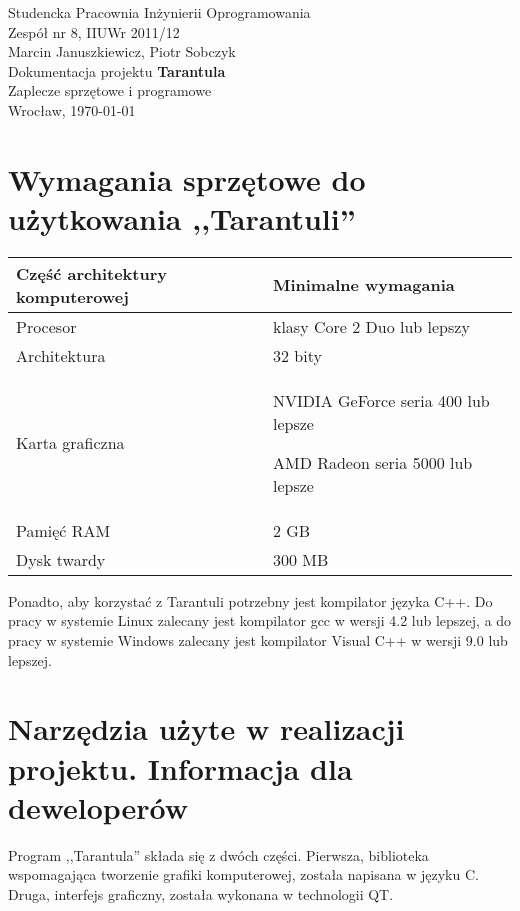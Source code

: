 \documentclass[11pt,leqno]{article}
\begin{document}

\begin{center}
\thispagestyle{empty}
{\Large Studencka Pracownia Inżynierii Oprogramowania}\\[0.5cm]
{\Large Zespół nr 8, IIUWr 2011/12}\\[2.5cm]

{Marcin Januszkiewicz, Piotr Sobczyk}\\[0.5cm]
{\huge Dokumentacja projektu \textbf{Tarantula}}\\[0.25cm]
{\Large Zaplecze sprzętowe i programowe}\\[0.5cm]
\vfill
{\large Wrocław, \today}
\end{center}

\newpage
\tableofcontents
\newpage


\section{Wymagania sprzętowe do użytkowania ,,Tarantuli''}

\begin{center}
 \begin{tabular}{|p{6cm}|p{7cm}|}
  \hline
 Część architektury komputerowej & Minimalne wymagania \\ \hline
  Procesor & klasy Core 2 Duo lub lepszy  \\ \hline
Architektura & 32 bity \\ \hline
 Karta graficzna & NVIDIA GeForce seria 400 lub lepsze


 AMD Radeon seria 5000 lub lepsze
  \\ \hline
Pamięć RAM & 2 GB \\ \hline
Dysk twardy & 300 MB \\ \hline
 \end{tabular}
\end{center}

Ponadto, aby korzystać z Tarantuli potrzebny jest kompilator języka C++. Do pracy w systemie Linux zalecany jest kompilator gcc w wersji 4.2 lub lepszej, a do pracy w systemie Windows zalecany jest kompilator Visual C++ w wersji 9.0 lub lepszej.


\section{Narzędzia użyte w realizacji projektu. Informacja dla deweloperów}
Program ,,Tarantula'' składa się z dwóch części. Pierwsza, biblioteka wspomagająca tworzenie grafiki komputerowej,
została napisana w języku C. Druga, interfejs graficzny, została wykonana w technologii QT.
\end{document}

